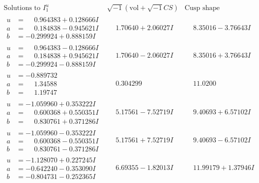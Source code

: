 \documentclass[1p]{elsarticle_modified}
\theoremstyle{definition}
\newcommand{\I}{\sqrt{-1}}
\begin{document}
$$\begin{array}{c|c|c}  
\text{Solutions to }I^u_{1}& \I (\text{vol} + \sqrt{-1}CS) & \text{Cusp shape}\\
 \hline 
\begin{aligned}
u &= \phantom{-}0.964383 + 0.128666 I \\
a &= \phantom{-}0.184838 - 0.945621 I \\
b &= -0.299924 + 0.888159 I\end{aligned}
 & \phantom{-}1.70640 + 2.06027 I & \phantom{-}8.35016 - 3.76643 I \\ \hline\begin{aligned}
u &= \phantom{-}0.964383 - 0.128666 I \\
a &= \phantom{-}0.184838 + 0.945621 I \\
b &= -0.299924 - 0.888159 I\end{aligned}
 & \phantom{-}1.70640 - 2.06027 I & \phantom{-}8.35016 + 3.76643 I \\ \hline\begin{aligned}
u &= -0.889732\phantom{ +0.000000I} \\
a &= \phantom{-}1.34588\phantom{ +0.000000I} \\
b &= \phantom{-}1.19747\phantom{ +0.000000I}\end{aligned}
 & \phantom{-}0.304299\phantom{ +0.000000I} & \phantom{-}11.0200\phantom{ +0.000000I} \\ \hline\begin{aligned}
u &= -1.059960 + 0.353222 I \\
a &= \phantom{-}0.600368 + 0.550351 I \\
b &= \phantom{-}0.830761 + 0.371286 I\end{aligned}
 & \phantom{-}5.17561 - 7.52719 I & \phantom{-}9.40693 + 6.57102 I \\ \hline\begin{aligned}
u &= -1.059960 - 0.353222 I \\
a &= \phantom{-}0.600368 - 0.550351 I \\
b &= \phantom{-}0.830761 - 0.371286 I\end{aligned}
 & \phantom{-}5.17561 + 7.52719 I & \phantom{-}9.40693 - 6.57102 I \\ \hline\begin{aligned}
u &= -1.128070 + 0.227245 I \\
a &= -0.642240 - 0.353090 I \\
b &= -0.804731 - 0.252365 I\end{aligned}
 & \phantom{-}6.69355 - 1.82013 I & \phantom{-}11.99179 + 1.37946 I \\ \hline\begin{aligned}

\end{aligned}
\end{array}$$
\end{document}
